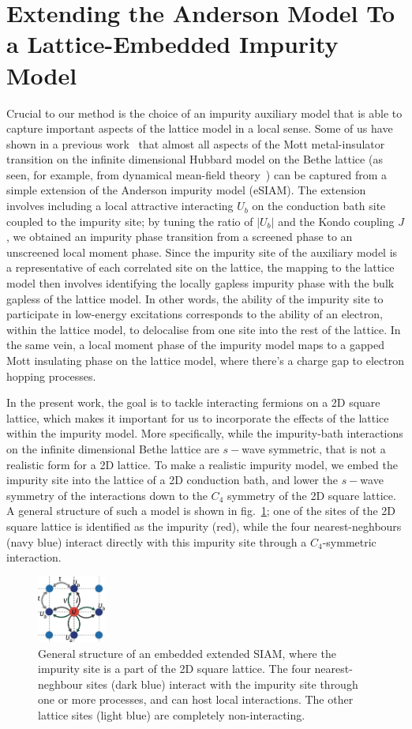 \documentclass[reprint,hidelinks,onecolumn]{revtex4-2}
\begin{document}
\section{Extending the Anderson Model To a Lattice-Embedded Impurity Model}
Crucial to our method is the choice of an impurity auxiliary model that is able to capture important aspects of the lattice model in a local sense. Some of us have shown in a previous work~\cite{Mukherjee_2023} that almost all aspects of the Mott metal-insulator transition on the infinite dimensional Hubbard model on the Bethe lattice (as seen, for example, from dynamical mean-field theory~\cite{georges1996}) can be captured from a simple extension of the Anderson impurity model (eSIAM). The extension involves including a local attractive interacting \(U_b\) on the conduction bath site coupled to the impurity site; by tuning the ratio of \(|U_b|\) and the Kondo coupling \(J\), we obtained an impurity phase transition from a screened phase to an unscreened local moment phase. Since the impurity site of the auxiliary model is a representative of each correlated site on the lattice, the mapping to the lattice model then involves identifying the locally gapless impurity phase with the bulk gapless of the lattice model. In other words, the ability of the impurity site to participate in low-energy excitations corresponds to the ability of an electron, within the lattice model, to delocalise from one site into the rest of the lattice. In the same vein, a local moment phase of the impurity model maps to a gapped Mott insulating phase on the lattice model, where there's a charge gap to electron hopping processes.

In the present work, the goal is to tackle interacting fermions on a 2D square lattice, which makes it important for us to incorporate the effects of the lattice within the impurity model. More specifically, while the impurity-bath interactions on the infinite dimensional Bethe lattice are \(s-\)wave symmetric, that is not a realistic form for a 2D lattice. To make a realistic impurity model, we embed the impurity site into the lattice of a 2D conduction bath, and lower the \(s-\)wave symmetry of the interactions down to the \(C_4\) symmetry of the 2D square lattice. A general structure of such a model is shown in fig.~\ref{embeddedEsiam}; one of the sites of the 2D square lattice is identified as the impurity (red), while the four nearest-neghbours (navy blue) interact directly with this impurity site through a \(C_4\)-symmetric interaction.
\begin{figure}[htpb]
	\centering
	\includegraphics[width=0.2\textwidth]{pWaveEsiam.pdf}
	\caption{General structure of an embedded extended SIAM, where the impurity site is a part of the 2D square lattice. The four nearest-neghbour sites (dark blue) interact with the impurity site through one or more processes, and can host local interactions. The other lattice sites (light blue) are completely non-interacting.}
	\label{embeddedEsiam}
\end{figure}
\end{document}
